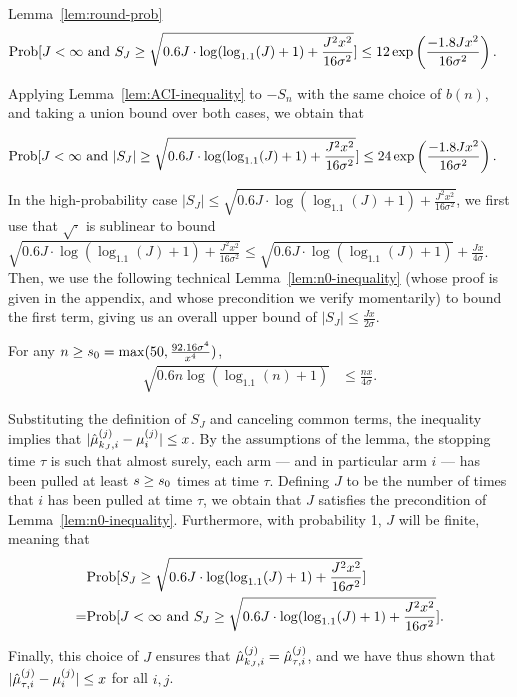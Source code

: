 \begin{extraproof}{Lemma~\ref{lem:round-prob}}
\begin{align*}
\Prob{J < \infty \mbox{ and } S_J \geq 
\sqrt{0.6 J \cdot \log (\log_{1.1}(J) + 1) + \frac{J^2 x^2}{16 \sigma^2}}}
& \leq 12 \exp \left( \frac{-1.8 J x^2}{16 \sigma^2} \right).
\end{align*}

Applying Lemma~\ref{lem:ACI-inequality} to $-S_n$ with the same choice
of $b(n)$, and taking a union bound over both cases, we obtain that

\begin{align*}
\Prob{J < \infty \mbox{ and } |S_J| \geq 
\sqrt{0.6 J \cdot \log (\log_{1.1}(J) + 1) + \frac{J^2 x^2}{16 \sigma^2}}}
& \leq 24 \exp \left( \frac{-1.8 J x^2}{16 \sigma^2} \right).
\end{align*}

In the high-probability case
$|S_J| \leq
\sqrt{0.6 J \cdot \log (\log_{1.1}(J) + 1) + \frac{J^2 x^2}{16 \sigma^2}}$,
we first use that $\sqrt{\cdot}$ is sublinear to bound
$\sqrt{0.6 J \cdot \log (\log_{1.1}(J) + 1) + \frac{J^2 x^2}{16 \sigma^2}}
\leq \sqrt{0.6 J \cdot \log (\log_{1.1}(J) + 1)} + \frac{J x}{4 \sigma}$.
Then, we use the following technical Lemma~\ref{lem:n0-inequality}
(whose proof is given in the appendix, and whose precondition we verify
momentarily) to bound the first term,
giving us an overall upper bound of
$|S_J| \leq \frac{J x}{2 \sigma}$.

\begin{lemma} \label{lem:n0-inequality}
For any $n \geq s_0 = \max (50, \frac{92.16 \sigma^4}{x^4})$, 
\begin{align*}
\sqrt{0.6 n \log (\log_{1.1}(n) + 1)} & \leq \frac{n x}{4 \sigma}. 
\end{align*}
\end{lemma}

Substituting the definition of $S_J$ and canceling common terms,
the inequality implies that
$|\hat{\mu}_{k_J,i}^{(j)} - \mu_{i}^{(j)}| \leq x$.
By the assumptions of the lemma,
the stopping time $\tau$ is such that almost surely, each arm --- and
in particular arm $i$ --- has been pulled at least
$s \geq s_0$ times at time $\tau$.
Defining $J$ to be the number of times that $i$ has been pulled at
time $\tau$, we obtain that $J$ satisfies the precondition of
Lemma~\ref{lem:n0-inequality}.
Furthermore, with probability 1, $J$ will be finite, meaning that
\begin{align*}
& \Prob{S_J \geq 
\sqrt{0.6 J \cdot \log (\log_{1.1}(J) + 1) + \frac{J^2 x^2}{16
    \sigma^2}}}\\
= & \Prob{J < \infty \mbox{ and } S_J \geq 
\sqrt{0.6 J \cdot \log (\log_{1.1}(J) + 1) + \frac{J^2 x^2}{16
    \sigma^2}}}.
\end{align*}

Finally, this choice of $J$ ensures that
$\hat{\mu}_{k_J,i}^{(j)} = \hat{\mu}_{\tau,i}^{(j)}$,
and we have thus shown that
$|\hat{\mu}_{\tau,i}^{(j)} - \mu_{i}^{(j)}| \leq x$ for all $i,j$.
\end{extraproof}

